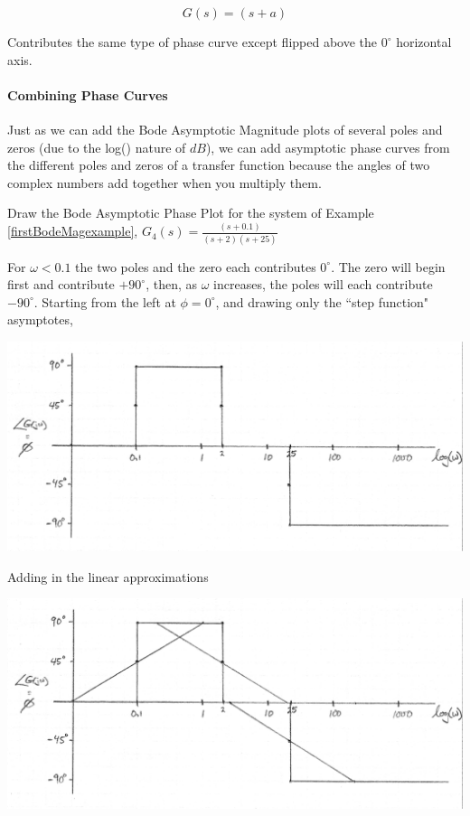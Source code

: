 \[
G(s) = (s+a)
\]

Contributes the same type of phase curve except flipped above the $0^\circ$ horizontal axis.

\paragraph{Combining Phase Curves}

Just as we can add the Bode Asymptotic Magnitude plots of several poles and zeros (due to the log() nature of $dB$), we can add asymptotic phase curves from the different poles and zeros of a transfer function because the angles of two complex numbers add together when you multiply them.

\begin{Example}

Draw the Bode Asymptotic Phase Plot for the system of Example \thechapter \ref{firstBodeMagexample}, 
$G_4(s) = \frac  {(s+0.1)}  {(s+2)(s+25)}$

For $\omega < 0.1$ the two poles and the zero each contributes $0^\circ$.  The zero will begin first and contribute $+90^\circ$, then, as $\omega$ increases, the  poles will each contribute $-90^\circ$.   Starting from the left at $\phi=0^\circ$, and drawing only the ``step function" asymptotes,


\includegraphics[width=5.5in]{figs05/00758a.png}

Adding in the linear approximations

\includegraphics[width=5.5in]{figs05/00759a.png}


\end{Example}
